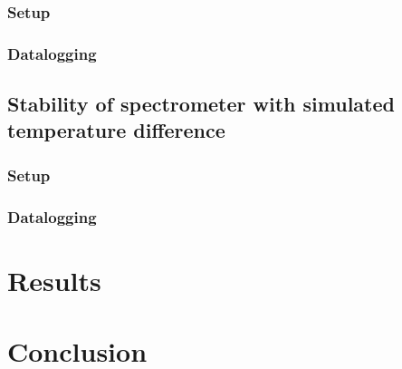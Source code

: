 \documentclass[danish,a4paper,oneside, twocolumn,article,9pt]{memoir}
\begin{document}
\subsection{Setup}
\subsection{Datalogging}


\section{Stability of spectrometer with simulated temperature difference}
\subsection{Setup}
\subsection{Datalogging}

\chapter{Results}

\chapter{Conclusion}
\newpage
\end{document}
